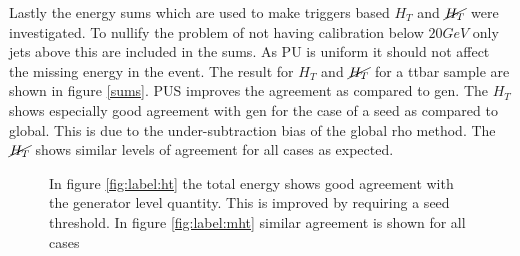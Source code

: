 Lastly the energy sums which are used to make triggers based $H_T$ and $\cancel{H_T}$ were investigated. To nullify the problem of not having calibration below $20GeV$ only jets above this are included in the sums.  As PU is uniform it should not affect the missing energy in the event. The result for $H_T$ and $\cancel{H_T}$ for a ttbar sample are shown in figure \ref{sums}. PUS improves the agreement as compared to gen.  The $H_T$ shows especially good agreement with gen for the case of a seed as compared to global. This is due to the under-subtraction bias of the global rho method. The $\cancel{H_T}$ shows similar levels of agreement for all cases as expected. 
\begin{figure}
\hfill
{}
\hfill
{}
\caption{In figure \ref{fig:label:ht} the total energy shows good agreement with the generator level quantity. This is improved by requiring a seed threshold. In figure \ref{fig:label:mht} similar agreement is shown for all cases}
\label{fig:label:sums}
\end{figure}
